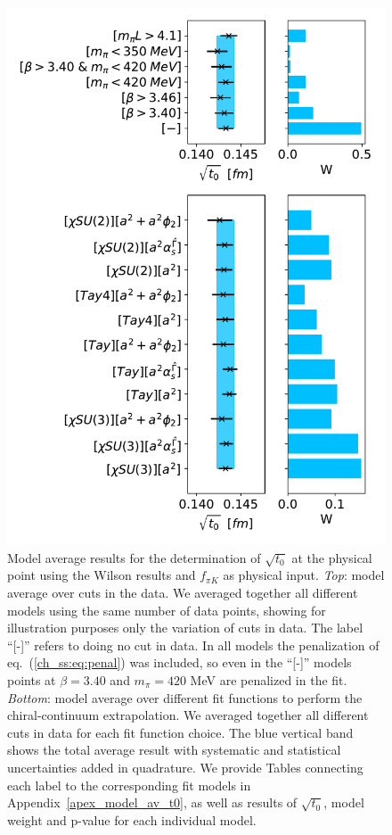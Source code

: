 \begin{figure}
    \centering
    \includegraphics[width=1.\textwidth]{./cap5/figs/BMA_w_subav_c=1_cphi=0.0035.pdf}
    \caption{Model average results for the determination of $\sqrt{t_0}$ at the physical point using the Wilson results and $f_{\pi K}$ as physical input. \textit{Top}: model average over cuts in the data. We averaged together all different models using the same number of data points, showing for illustration purposes only the variation of cuts in data. The label ``[-]'' refers to doing no cut in data. In all models the penalization of eq.~(\ref{ch_ss:eq:penal}) was included, so even in the ``[-]'' models points at $\beta=3.40$ and $m_{\pi}=420$ MeV are penalized in the fit. \textit{Bottom}: model average over different fit functions to perform the chiral-continuum extrapolation. We averaged together all different cuts in data for each fit function choice. The blue vertical band shows the total average result with systematic and statistical uncertainties added in quadrature. We provide Tables connecting each label to the corresponding fit models in Appendix~\ref{apex_model_av_t0}, as well as results of $\sqrt{t_0}$, model weight and p-value for each individual model.}
    \label{ch_ss:fig:BMA_w}
\end{figure}

